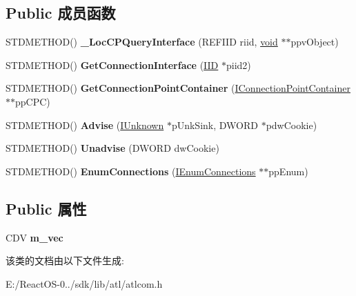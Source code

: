 \subsection*{Public 成员函数}
\begin{DoxyCompactItemize}
\item 
\mbox{\label{class_a_t_l_1_1_i_connection_point_impl_a9d723171d5526f537dc5b667e21bedcf}} 
S\+T\+D\+M\+E\+T\+H\+OD() {\bfseries \+\_\+\+Loc\+C\+P\+Query\+Interface} (R\+E\+F\+I\+ID riid, \hyperlink{interfacevoid}{void} $\ast$$\ast$ppv\+Object)
\item 
\mbox{\label{class_a_t_l_1_1_i_connection_point_impl_ab5638340b2c310dbabac2450f7198a9c}} 
S\+T\+D\+M\+E\+T\+H\+OD() {\bfseries Get\+Connection\+Interface} (\hyperlink{struct___i_i_d}{I\+ID} $\ast$piid2)
\item 
\mbox{\label{class_a_t_l_1_1_i_connection_point_impl_ac2076a5bb7ee4f2b2bad0847c6b1dd54}} 
S\+T\+D\+M\+E\+T\+H\+OD() {\bfseries Get\+Connection\+Point\+Container} (\hyperlink{interface_i_connection_point_container}{I\+Connection\+Point\+Container} $\ast$$\ast$pp\+C\+PC)
\item 
\mbox{\label{class_a_t_l_1_1_i_connection_point_impl_aa08ebf8a4b4cdb743b51728524b9c4d8}} 
S\+T\+D\+M\+E\+T\+H\+OD() {\bfseries Advise} (\hyperlink{interface_i_unknown}{I\+Unknown} $\ast$p\+Unk\+Sink, D\+W\+O\+RD $\ast$pdw\+Cookie)
\item 
\mbox{\label{class_a_t_l_1_1_i_connection_point_impl_a9b79ea501b4270971f5c891692a944d5}} 
S\+T\+D\+M\+E\+T\+H\+OD() {\bfseries Unadvise} (D\+W\+O\+RD dw\+Cookie)
\item 
\mbox{\label{class_a_t_l_1_1_i_connection_point_impl_ae7a28a0b842231e0cfd439f7d3786952}} 
S\+T\+D\+M\+E\+T\+H\+OD() {\bfseries Enum\+Connections} (\hyperlink{interface_i_enum_connections}{I\+Enum\+Connections} $\ast$$\ast$pp\+Enum)
\end{DoxyCompactItemize}
\subsection*{Public 属性}
\begin{DoxyCompactItemize}
\item 
\mbox{\label{class_a_t_l_1_1_i_connection_point_impl_a39ae61fa47a96ea7372bb8f8e43c650e}} 
C\+DV {\bfseries m\+\_\+vec}
\end{DoxyCompactItemize}


该类的文档由以下文件生成\+:\begin{DoxyCompactItemize}
\item 
E\+:/\+React\+O\+S-\/0../sdk/lib/atl/atlcom.\+h\end{DoxyCompactItemize}
